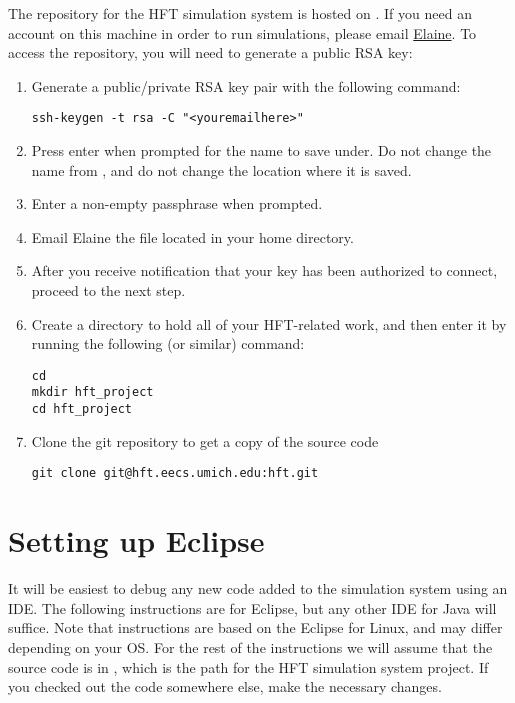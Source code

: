 \documentclass[11pt]{article}
\begin{document}
The repository for the HFT simulation system is hosted on . If you need an account on this machine in order to run simulations, please email \href{mailto:ewah@umich.edu}{Elaine}.
To access the repository, you will need to generate a public RSA key:
\begin{enumerate}
\item Generate a public/private RSA key pair with the following command:

\begin{verbatim}
ssh-keygen -t rsa -C "<youremailhere>"
\end{verbatim}

\item Press enter when prompted for the name to save under. Do not change the name from , and do not change the location where it is saved.
\item Enter a non-empty passphrase when prompted.
\item Email Elaine the  file located in your home directory.
\item After you receive notification that your key has been authorized to connect, proceed to the next step.
\item Create a directory to hold all of your HFT-related work, and then enter it by running the following (or similar) command:
\begin{verbatim}
cd
mkdir hft_project
cd hft_project
\end{verbatim}

\item Clone the git repository to get a copy of the source code
\begin{verbatim}
git clone git@hft.eecs.umich.edu:hft.git
\end{verbatim}

\end{enumerate}

\section{Setting up Eclipse}
It will be easiest to debug any new code added to the simulation system using an IDE. The following instructions are for Eclipse, but any other IDE for Java will suffice. Note that instructions are based on the Eclipse for Linux, and may differ depending on your OS. For the rest of the instructions we will assume that the source code is in , which is the path for the HFT simulation system project. If you checked out the code somewhere else, make the necessary changes.
\end{document}
